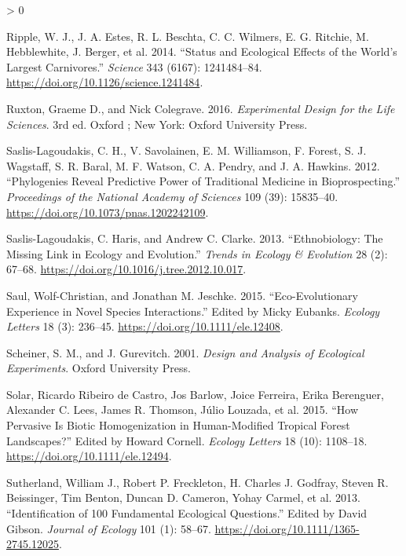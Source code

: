 \documentclass[
]{article}
\newlength{\cslhangindent}
\newenvironment{CSLReferences}[2] %
 {%
  \setlength{\parindent}{0pt}
  \ifodd #1 \everypar{\setlength{\hangindent}{\cslhangindent}}\ignorespaces\fi
  \ifnum #2 > 0
  \setlength{\parskip}{#2\baselineskip}
  \fi
 }%
 {}
\begin{document}
\begin{CSLReferences}{1}{0}
\leavevmode\hypertarget{ref-ripple_status_2014}{}%
Ripple, W. J., J. A. Estes, R. L. Beschta, C. C. Wilmers, E. G. Ritchie, M. Hebblewhite, J. Berger, et al. 2014. {``Status and {Ecological} {Effects} of the {World}'s {Largest} {Carnivores}.''} \emph{Science} 343 (6167): 1241484--84. \url{https://doi.org/10.1126/science.1241484}.

\leavevmode\hypertarget{ref-ruxton_experimental_2016}{}%
Ruxton, Graeme D., and Nick Colegrave. 2016. \emph{Experimental Design for the Life Sciences}. 3rd ed. Oxford ; New York: Oxford University Press.

\leavevmode\hypertarget{ref-saslis-lagoudakis_phylogenies_2012}{}%
Saslis-Lagoudakis, C. H., V. Savolainen, E. M. Williamson, F. Forest, S. J. Wagstaff, S. R. Baral, M. F. Watson, C. A. Pendry, and J. A. Hawkins. 2012. {``Phylogenies Reveal Predictive Power of Traditional Medicine in Bioprospecting.''} \emph{Proceedings of the National Academy of Sciences} 109 (39): 15835--40. \url{https://doi.org/10.1073/pnas.1202242109}.

\leavevmode\hypertarget{ref-saslis-lagoudakis_ethnobiology:_2013}{}%
Saslis-Lagoudakis, C. Haris, and Andrew C. Clarke. 2013. {``Ethnobiology: The Missing Link in Ecology and Evolution.''} \emph{Trends in Ecology \& Evolution} 28 (2): 67--68. \url{https://doi.org/10.1016/j.tree.2012.10.017}.

\leavevmode\hypertarget{ref-saul_eco-evolutionary_2015}{}%
Saul, Wolf-Christian, and Jonathan M. Jeschke. 2015. {``Eco-Evolutionary Experience in Novel Species Interactions.''} Edited by Micky Eubanks. \emph{Ecology Letters} 18 (3): 236--45. \url{https://doi.org/10.1111/ele.12408}.

\leavevmode\hypertarget{ref-scheiner_design_2001}{}%
Scheiner, S. M., and J. Gurevitch. 2001. \emph{Design and Analysis of Ecological Experiments}. Oxford University Press.

\leavevmode\hypertarget{ref-solar_how_2015}{}%
Solar, Ricardo Ribeiro de Castro, Jos Barlow, Joice Ferreira, Erika Berenguer, Alexander C. Lees, James R. Thomson, Júlio Louzada, et al. 2015. {``How Pervasive Is Biotic Homogenization in Human-Modified Tropical Forest Landscapes?''} Edited by Howard Cornell. \emph{Ecology Letters} 18 (10): 1108--18. \url{https://doi.org/10.1111/ele.12494}.

\leavevmode\hypertarget{ref-sutherland_identification_2013}{}%
Sutherland, William J., Robert P. Freckleton, H. Charles J. Godfray, Steven R. Beissinger, Tim Benton, Duncan D. Cameron, Yohay Carmel, et al. 2013. {``Identification of 100 Fundamental Ecological Questions.''} Edited by David Gibson. \emph{Journal of Ecology} 101 (1): 58--67. \url{https://doi.org/10.1111/1365-2745.12025}.


\end{CSLReferences}
\end{document}
